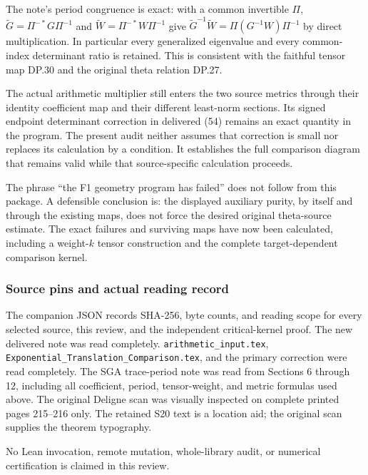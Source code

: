 The note's period congruence is exact: with a common invertible \(\Pi\), \(\widetilde G=\Pi^{-*}G\Pi^{-1}\) and \(\widetilde W=\Pi^{-*}W\Pi^{-1}\) give \(\widetilde G^{-1}\widetilde W=\Pi(G^{-1}W)\Pi^{-1}\) by direct multiplication. In particular every generalized eigenvalue and every common-index determinant ratio is retained. This is consistent with the faithful tensor map DP.30 and the original theta relation DP.27.

The actual arithmetic multiplier still enters the two source metrics through their identity coefficient map and their different least-norm sections. Its signed endpoint determinant correction in delivered (54) remains an exact quantity in the program. The present audit neither assumes that correction is small nor replaces its calculation by a condition. It establishes the full comparison diagram that remains valid while that source-specific calculation proceeds.

The phrase ``the F1 geometry program has failed'' does not follow from this package. A defensible conclusion is: the displayed auxiliary purity, by itself and through the existing maps, does not force the desired original theta-source estimate. The exact failures and surviving maps have now been calculated, including a weight-\(k\) tensor construction and the complete target-dependent comparison kernel.

\subsubsection{Source pins and actual reading record}\label{endpoint-purity_review--source-pins-and-actual-reading-record}

The companion JSON records SHA-256, byte counts, and reading scope for every selected source, this review, and the independent critical-kernel proof. The new delivered note was read completely. \nolinkurl{arithmetic_input.tex}, \nolinkurl{Exponential_Translation_Comparison.tex}, and the primary correction were read completely. The SGA trace-period note was read from Sections 6 through 12, including all coefficient, period, tensor-weight, and metric formulas used above. The original Deligne scan was visually inspected on complete printed pages 215--216 only. The retained S20 text is a location aid; the original scan supplies the theorem typography.

No Lean invocation, remote mutation, whole-library audit, or numerical certification is claimed in this review.

\endgroup


\endgroup
